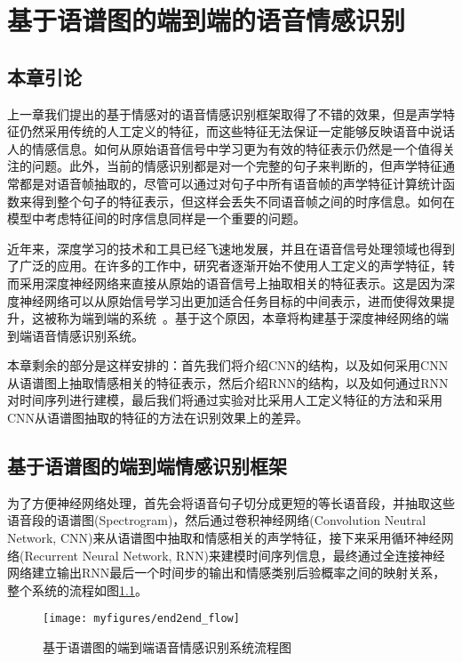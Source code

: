 \chapter{基于语谱图的端到端的语音情感识别}
\label{cha:end2end}

\section{本章引论}
\label{sec:end2end_intro}

上一章我们提出的基于情感对的语音情感识别框架取得了不错的效果，但是声学特征仍然采用传统的人工定义的特征，而这些特征无法保证一定能够反映语音中说话人的情感信息。如何从原始语音信号中学习更为有效的特征表示仍然是一个值得关注的问题。此外，当前的情感识别都是对一个完整的句子来判断的，但声学特征通常都是对语音帧抽取的，尽管可以通过对句子中所有语音帧的声学特征计算统计函数来得到整个句子的特征表示，但这样会丢失不同语音帧之间的时序信息。如何在模型中考虑特征间的时序信息同样是一个重要的问题。

近年来，深度学习的技术和工具已经飞速地发展，并且在语音信号处理领域也得到了广泛的应用。在许多的工作中，研究者逐渐开始不使用人工定义的声学特征，转而采用深度神经网络来直接从原始的语音信号上抽取相关的特征表示。这是因为深度神经网络可以从原始信号学习出更加适合任务目标的中间表示，进而使得效果提升，这被称为端到端的系统~\cite{Trigeorgis2016Adieu, Satt2017Efficient}。基于这个原因，本章将构建基于深度神经网络的端到端语音情感识别系统。

本章剩余的部分是这样安排的：首先我们将介绍CNN的结构，以及如何采用CNN从语谱图上抽取情感相关的特征表示，然后介绍RNN的结构，以及如何通过RNN对时间序列进行建模，最后我们将通过实验对比采用人工定义特征的方法和采用CNN从语谱图抽取的特征的方法在识别效果上的差异。

\section{基于语谱图的端到端情感识别框架}
\label{sec:cnn_spectrogram_feature}

为了方便神经网络处理，首先会将语音句子切分成更短的等长语音段，并抽取这些语音段的语谱图(Spectrogram)，然后通过卷积神经网络(Convolution Neutral Network, CNN)来从语谱图中抽取和情感相关的声学特征，接下来采用循环神经网络(Recurrent Neural Network, RNN)来建模时间序列信息，最终通过全连接神经网络建立输出RNN最后一个时间步的输出和情感类别后验概率之间的映射关系，整个系统的流程如图\ref{fig:end2end_flow}。

\begin{figure}[htb] %
    \centering
    \texttt{[image: myfigures/end2end\_flow]}
    \caption{基于语谱图的端到端语音情感识别系统流程图}
    \label{fig:end2end_flow}
\end{figure}

